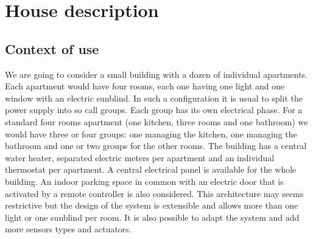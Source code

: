\documentclass{acm_proc_article-sp}
\begin{document}
\section{House description}
\subsection{Context of use}
We are going to consider a small building with a dozen of individual apartments. 
Each apartment would have four rooms, each one having one light and one window with an electric sunblind. 
In such a configuration it is usual to split the power supply into so call groups. 
Each group has its own electrical phase. 
For a standard four rooms apartment (one kitchen, three rooms and one bathroom) we would have three or four groups: one managing the kitchen, one managing the bathroom and one or two groups for the other rooms. 
The building has a central water heater, separated electric meters per apartment and an individual thermostat per apartment. 
A central electrical panel is available for the whole building. An indoor parking space in common with an electric door that is activated by a remote controller is also considered.
This architecture may seems restrictive but the design of the system is extensible and allows more than one light or one sunblind per room.
It is also possible to adapt the system and add more sensors types and actuators.
\end{document}
